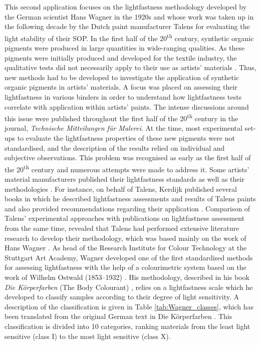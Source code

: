 This second application focuses on the lightfastness methodology developed by the German scientist Hans Wagner in the 1920s and whose work was taken up in the following decade by the Dutch paint manufacturer Talens for evaluating the light stability of their \gls{SOP}. In the first half of the 20\textsuperscript{th} century, synthetic organic pigments were produced in large quantities in wide-ranging qualities. As these pigments were initially produced and developed for the textile industry, the qualitative tests did not necessarily apply to their use as artists' materials \citep[174]{eibner_untersuchungen_1905}. Thus, new methods had to be developed to investigate the application of synthetic organic pigments in artists' materials. A focus was placed on assessing their lightfastness in various binders in order to understand how lightfastness tests correlate with application within artists' paints. The intense discussions around this issue were published throughout the first half of the 20\textsuperscript{th} century in the journal, \textit{Technische Mitteilungen für Malerei}. At the time, most experimental set-ups to evaluate the lightfastness properties of these new pigments were not standardised, and the description of the results relied on individual and subjective observations. This problem was recognised as early as the first half of the 20\textsuperscript{th} century and numerous attempts were made to address it. Some artists’ material manufacturers published their lightfastness standards as well as their methodologies \citep{schmincke__co_neuen_1912, kerdijk_kunstschildersmaterialen_1932,winsor__newton_few_1948}. For instance, on behalf of Talens, Kerdijk published several books in which he described lightfastness assessments and results of Talens paints and also provided recommendations regarding their application \citep{kerdijk_kunstschildersmaterialen_1932,kerdijk_kunstschildersmaterialen_1937}. Comparison of Talens’ experimental approaches with publications on lightfastness assessment from the same time, revealed that Talens had performed extensive literature research to develop their methodology, which was based mainly on the work of Hans Wagner \citep{van_den_berg_making_2016, pause_synthetic_2019}. As head of the Research Institute for Colour Technology at the Stuttgart Art Academy, Wagner developed one of the first standardised methods for assessing lightfastness with the help of a colourimetric system based on the work of Wilhelm Ostwald (1853–1932) \citep{ostwald_farbenfibel_1917}. His methodology, described in his book \textit{Die K\"{o}rperfarben} (The Body Colourant) \citep{wagner_korperfarben_1928}, relies on a lightfastness scale which he developed to classify samples according to their degree of light sensitivity. A description of the classification is given in Table \ref{tab:Wagner_classes}, which has been translated from the original German text in Die Körperfarben \citep[p.33]{wagner_korperfarben_1928}. This classification is divided into 10 categories, ranking materials from the least light sensitive (class I) to the most light sensitive (class X).\\

